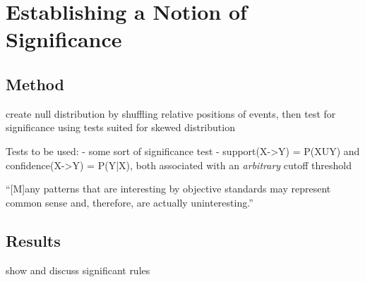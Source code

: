 
\chapter{Establishing a Notion of Significance}
\section{Method}
create null distribution by shuffling relative positions of events, then test for significance using tests suited for skewed distribution

Tests to be used:
- some sort of significance test
- support(X->Y) = P(XUY) and confidence(X->Y) = P(Y|X), both associated with an \emph{arbitrary} cutoff threshold \cite[p.~21~ff.]{han12}

``[M]any patterns that are interesting by objective standards may represent common sense and, therefore, are actually uninteresting.'' \cite[p.~22]{han12}
\section{Results}
show and discuss significant rules